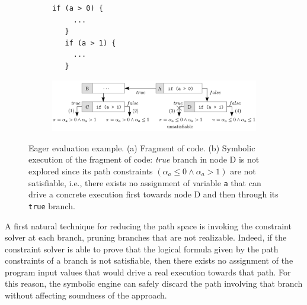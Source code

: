 \begin{figure}[t]
  \begin{subfigure}{.29\textwidth}
    \vspace{0mm}
    \begin{lstlisting}[basicstyle=\ttfamily\scriptsize]
   if (a > 0) {
     ...
   } 
   if (a > 1) {
     ...
   }
    \end{lstlisting}
    \vspace{3.5mm}
    \caption{}
  \end{subfigure}%
  \begin{subfigure}{.70\textwidth}
    \centering
    \includegraphics[width=1.0\columnwidth]{images/eager-evaluation} 
    \caption{}
  \end{subfigure}%
  \caption{Eager evaluation example. (a) Fragment of code. (b) Symbolic execution of the fragment of code: {\em true} branch in node D is not explored since its path constraints $(\alpha_a \leq 0 \wedge \alpha_a > 1)$ are not satisfiable, i.e., there exists no assignment of variable {\tt a} that can drive a concrete execution first towards node D and then through its {\tt true} branch.}
  \label{fig:eager-evaluation}
\end{figure}

A first natural technique for reducing the path space is invoking the constraint solver at each branch, pruning branches that are not realizable. Indeed, if the constraint solver is able to prove that the logical formula given by the path constraints of a branch is not satisfiable, then there exists no assignment of the program input values that would drive a real execution towards that path. For this reason, the symbolic engine can safely discard the path involving that branch without affecting soundness of the approach. 

